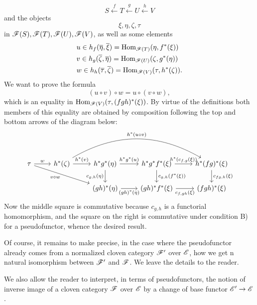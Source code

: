 \[
    S \xleftarrow{f} T \xleftarrow{g} U \xleftarrow{h} V
\]
and the objects
\[\xi, \eta, \zeta, \tau\]
in $\mathscr{F} (S), \mathscr{F} (T), \mathscr{F} (U), \mathscr{F} (V)$, as well as some elements
\begin{align*}
    &u \in h_f(\overline \eta, \overline \xi) = \mathrm{Hom}_{\mathscr{F}(T)} (\eta, f^\ast(\xi))\\
    &v \in h_g(\overline \zeta, \overline \eta) = \mathrm{Hom}_{\mathscr{F}(U)} (\zeta, g^\ast(\eta))\\
    &w \in h_h(\overline \tau, \overline \zeta) = \mathrm{Hom}_{\mathscr{F}(V)} (\tau, h^\ast(\zeta)).
\end{align*}
We want to prove the formula
\[(u \circ v) \circ w = u \circ (v \circ w),
\]
which is an equality in $\mathrm{Hom}_{\mathscr{F} (V)} (\tau, (fgh)^\ast(\xi))$. By virtue of the definitions both members of this equality are obtained by composition following the top and bottom arrows of the diagram below:
\[
\begin{tikzcd}
    \tau
    \arrow[r, "w"]
    \arrow[rrd, "v \circ w", swap]
    &
    h^\ast(\zeta) 
    \arrow[r, "h^\ast(v)"]
    \arrow[rrr, "h^\ast (u \circ v)", bend left]
    &
    h^\ast g^\ast(\eta)
    \arrow[r, "h^\ast g^\ast (u)"]
    \arrow[d, "c_{g,h}(\eta)", swap]
    &
    h^\ast g^\ast f^\ast (\xi)
    \arrow[r, "h^\ast (c_{f,g}(\xi))"]
    \arrow[d, "c_{g,h}(f^\ast (\xi))"]
    &
    h^\ast (fg)^\ast (\xi)
    \arrow[d, "c_{fg,h}(\xi)"]
    \\&&
    (gh)^\ast (\eta)
    \arrow[r, "(gh)^\ast (\eta)", swap]
    &
    (gh)^\ast f^\ast (\xi)
    \arrow[r, "c_{f,gh}(\xi)", swap]
    &
    (fgh)^\ast (\xi)
\end{tikzcd}\]
Now the middle square is commutative because $c_{g, h}$ is a functorial homomorphism, and the square on the right is commutative under condition B) for a pseudofunctor, whence the desired result.

Of course, it remains to make precise, in the case where the pseudofunctor already comes from a normalized cloven category $\mathscr{F}'$ over $\mathscr{E}$, how we get n natural isomorphism between $\mathscr{F}'$ and $\mathscr{F}$. We leave the details to the reader.

We also allow the reader to interpret, in terms of pseudofunctors, the notion of inverse image of a cloven category $\mathscr{F}$ over $\mathscr{E}$ by a change of base functor $\mathscr{E}'\to \mathscr{E}$.
